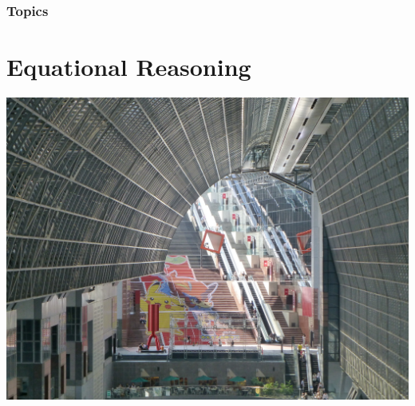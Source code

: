 \documentclass{beamer}
\begin{document}
\begin{frame}
  \PresentationTitleSlide
\end{frame}



\begin{frame}
  \frametitle{Topics}
  \tableofcontents
\end{frame}
\section{Equational Reasoning}
\begin{frame}
\begin{center}
\includegraphics[scale=0.075]
    {figures/jpg/pic06b.jpg}
\end{center}
\end{frame}


\end{document}
